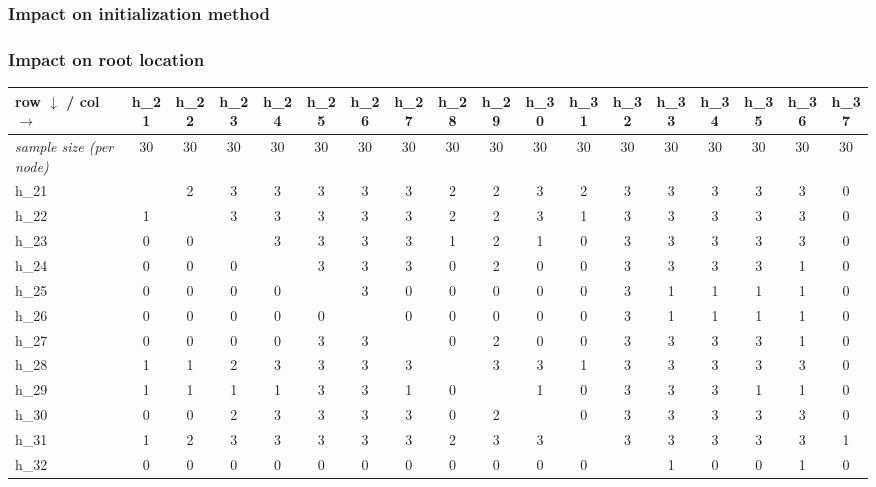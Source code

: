 \documentclass[]{article}
\begin{document}
			\subsubsection{Impact on initialization method}
			\subsubsection{Impact on root location}
			\begin{table}[htbp]
				\centering
				\small
				\setlength{\tabcolsep}{4pt}
				\renewcommand{\arraystretch}{1.1}
				\begin{tabular}{l*{17}{c}}
					\toprule
					row $\downarrow$ / col $\rightarrow$
					& h\_21 & h\_22 & h\_23 & h\_24 & h\_25 & h\_26 & h\_27 & h\_28 & h\_29 & h\_30 & h\_31 & h\_32 & h\_33 & h\_34 & h\_35 & h\_36 & h\_37 \\
					\midrule
					\textit{sample size (per node)}
					& 30 & 30 & 30 & 30 & 30 & 30 & 30 & 30 & 30 & 30 & 30 & 30 & 30 & 30 & 30 & 30 & 30 \\
					\midrule
					h\_21 & \textemdash & 2 & 3 & 3 & 3 & 3 & 3 & 2 & 2 & 3 & 2 & 3 & 3 & 3 & 3 & 3 & 0 \\
					h\_22 & 1 & \textemdash & 3 & 3 & 3 & 3 & 3 & 2 & 2 & 3 & 1 & 3 & 3 & 3 & 3 & 3 & 0 \\
					h\_23 & 0 & 0 & \textemdash & 3 & 3 & 3 & 3 & 1 & 2 & 1 & 0 & 3 & 3 & 3 & 3 & 3 & 0 \\
					h\_24 & 0 & 0 & 0 & \textemdash & 3 & 3 & 3 & 0 & 2 & 0 & 0 & 3 & 3 & 3 & 3 & 1 & 0 \\
					h\_25 & 0 & 0 & 0 & 0 & \textemdash & 3 & 0 & 0 & 0 & 0 & 0 & 3 & 1 & 1 & 1 & 1 & 0 \\
					h\_26 & 0 & 0 & 0 & 0 & 0 & \textemdash & 0 & 0 & 0 & 0 & 0 & 3 & 1 & 1 & 1 & 1 & 0 \\
					h\_27 & 0 & 0 & 0 & 0 & 3 & 3 & \textemdash & 0 & 2 & 0 & 0 & 3 & 3 & 3 & 3 & 1 & 0 \\
					h\_28 & 1 & 1 & 2 & 3 & 3 & 3 & 3 & \textemdash & 3 & 3 & 1 & 3 & 3 & 3 & 3 & 3 & 0 \\
					h\_29 & 1 & 1 & 1 & 1 & 3 & 3 & 1 & 0 & \textemdash & 1 & 0 & 3 & 3 & 3 & 1 & 1 & 0 \\
					h\_30 & 0 & 0 & 2 & 3 & 3 & 3 & 3 & 0 & 2 & \textemdash & 0 & 3 & 3 & 3 & 3 & 3 & 0 \\
					h\_31 & 1 & 2 & 3 & 3 & 3 & 3 & 3 & 2 & 3 & 3 & \textemdash & 3 & 3 & 3 & 3 & 3 & 1 \\
					h\_32 & 0 & 0 & 0 & 0 & 0 & 0 & 0 & 0 & 0 & 0 & 0 & \textemdash & 1 & 0 & 0 & 1 & 0 \\

\end{tabular}
\end{table}
\end{document}
